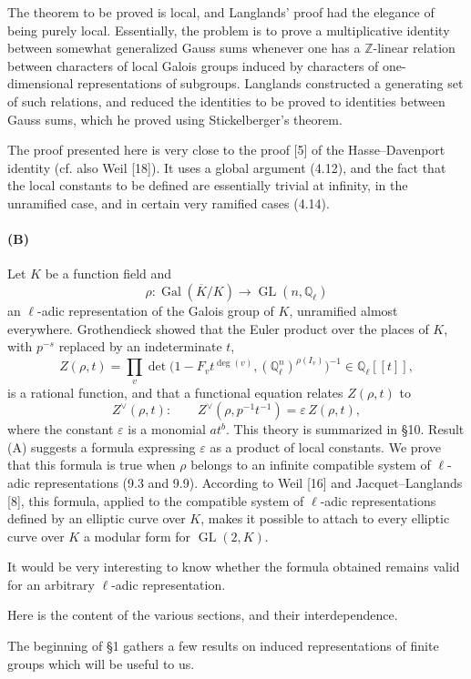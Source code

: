 \documentclass[10pt]{article}
\newcommand{\Q}{\mathbb Q}
\newcommand{\Z}{\mathbb Z}
\newcommand{\Gal}{\operatorname{Gal}}
\newcommand{\GL}{\operatorname{GL}}
\providecommand{\Gal}{\operatorname{Gal}}
\providecommand{\GL}{\operatorname{GL}}
\providecommand{\Gal}{\operatorname{Gal}}
\providecommand{\GL}{\operatorname{GL}}
\providecommand{\Gal}{\operatorname{Gal}}
\providecommand{\Gal}{\operatorname{Gal}}
\begin{document}
The theorem to be proved is local, and Langlands' proof had the elegance of being purely local. Essentially, the problem is to prove a multiplicative identity between somewhat generalized Gauss sums whenever one has a \(\Z\)-linear relation between characters of local Galois groups induced by characters of one-dimensional representations of subgroups. Langlands constructed a generating set of such relations, and reduced the identities to be proved to identities between Gauss sums, which he proved using Stickelberger's theorem.

The proof presented here is very close to the proof [5] of the Hasse--Davenport identity (cf. also Weil [18]). It uses a global argument (4.12), and the fact that the local constants to be defined are essentially trivial at infinity, in the unramified case, and in certain very ramified cases (4.14).

\paragraph{(B)} Let \(K\) be a function field and
\[
\rho:\Gal(\overline K/K)\longrightarrow \GL(n,\Q_\ell)
\]
an \(\ell\)-adic representation of the Galois group of \(K\), unramified almost everywhere. Grothendieck showed that the Euler product over the places of \(K\), with \(p^{-s}\) replaced by an indeterminate \(t\),
\[
Z(\rho,t)=\prod_v\det\bigl(1-F_vt^{\deg(v)},(\Q_\ell^n)^{\rho(I_v)}\bigr)^{-1}
\in\Q_\ell[[t]],
\]
is a rational function, and that a functional equation relates \(Z(\rho,t)\) to
\[
Z^\vee(\rho,t):
\qquad
Z^\vee(\rho,p^{-1}t^{-1})=\varepsilon\, Z(\rho,t),
\]
where the constant \(\varepsilon\) is a monomial \(at^b\). This theory is summarized in §10. Result (A) suggests a formula expressing \(\varepsilon\) as a product of local constants. We prove that this formula is true when \(\rho\) belongs to an infinite compatible system of \(\ell\)-adic representations (9.3 and 9.9). According to Weil [16] and Jacquet--Langlands [8], this formula, applied to the compatible system of \(\ell\)-adic representations defined by an elliptic curve over \(K\), makes it possible to attach to every elliptic curve over \(K\) a modular form for \(\GL(2,K)\).

It would be very interesting to know whether the formula obtained remains valid for an arbitrary \(\ell\)-adic representation.

Here is the content of the various sections, and their interdependence.

The beginning of §1 gathers a few results on induced representations of finite groups which will be useful to us.
\end{document}
